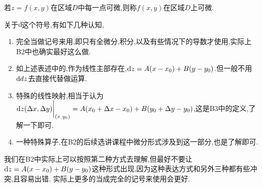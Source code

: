 若$z=f(x,y)$在区域$D$中每一点可微,则称$f(x,y)$在区域$D$上可微.

\begin{remark}
    关于$\operatorname{d\!}$这个符号,有如下几种认知,
    \begin{enumerate}
        \item 完全当做记号来用,即只有全微分,积分,以及有些情况下的导数才使用,实际上B2中也确实最好这么做.
        \item 如上述表述中的,作为线性主部存在,$\operatorname{d\!}{}z=A(x-x_0)+B(y-y_0)$.但一般不用$\operatorname{d\!}{}d z$去直接代替做运算.
        \item 特殊的线性映射,相当于认为$\operatorname{d\!}{}z(\Delta x,\Delta y)\bigg|_{(x_,y_0)}=A(x_0+\Delta x-x_0)+B(y_0+\Delta y-y_0)$,这是B3中的定义,了解一下即可.
        \item 一种特殊算子,在B2的后续选讲课程中微分形式涉及到这一部分,也是了解即可.
    \end{enumerate}
    我们在B2中实际上可以按照第二种方式去理解,但最好不要让$\operatorname{d\!}{}z=A(x-x_0)+B(y-y_0)$这种形式出现,因为这种表达方式和另外三种都有些冲突,且容易出错.
    实际上更多的当成完全的记号来使用会更好.
\end{remark}

